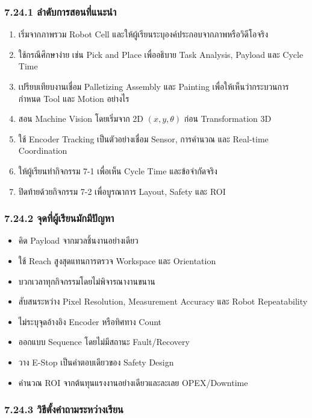 \subsubsection{7.24.1 ลำดับการสอนที่แนะนำ}

\begin{enumerate}
    \item เริ่มจากภาพรวม Robot Cell และให้ผู้เรียนระบุองค์ประกอบจากภาพหรือวิดีโอจริง
    \item ใช้กรณีศึกษาง่าย เช่น Pick and Place เพื่ออธิบาย Task Analysis, Payload และ Cycle Time
    \item เปรียบเทียบงานเชื่อม Palletizing Assembly และ Painting เพื่อให้เห็นว่ากระบวนการกำหนด Tool และ Motion อย่างไร
    \item สอน Machine Vision โดยเริ่มจาก 2D $(x,y,\theta)$ ก่อน Transformation 3D
    \item ใช้ Encoder Tracking เป็นตัวอย่างเชื่อม Sensor, การคำนวณ และ Real-time Coordination
    \item ให้ผู้เรียนทำกิจกรรม 7-1 เพื่อเห็น Cycle Time และข้อจำกัดจริง
    \item ปิดท้ายด้วยกิจกรรม 7-2 เพื่อบูรณาการ Layout, Safety และ ROI
\end{enumerate}

\subsubsection{7.24.2 จุดที่ผู้เรียนมักมีปัญหา}

\begin{itemize}
    \item คิด Payload จากมวลชิ้นงานอย่างเดียว
    \item ใช้ Reach สูงสุดแทนการตรวจ Workspace และ Orientation
    \item บวกเวลาทุกกิจกรรมโดยไม่พิจารณางานขนาน
    \item สับสนระหว่าง Pixel Resolution, Measurement Accuracy และ Robot Repeatability
    \item ไม่ระบุจุดอ้างอิง Encoder หรือทิศทาง Count
    \item ออกแบบ Sequence โดยไม่มีสถานะ Fault/Recovery
    \item วาง E-Stop เป็นคำตอบเดียวของ Safety Design
    \item คำนวณ ROI จากต้นทุนแรงงานอย่างเดียวและละเลย OPEX/Downtime
\end{itemize}

\subsubsection{7.24.3 วิธีตั้งคำถามระหว่างเรียน}

